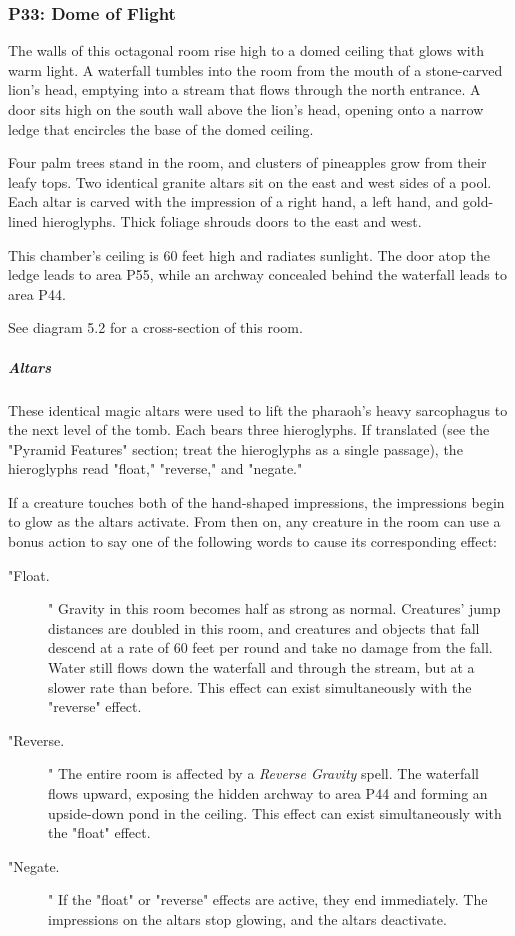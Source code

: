 \documentclass[10pt,a4paper,twoside,bg=print,twocolumn,openany,nodeprecatedcode]{dndbook}
\begin{document}
\subsubsection{P33: Dome of Flight}
\begin{DndReadAloud}{}
The walls of this octagonal room rise high to a domed ceiling that glows with warm light. A waterfall tumbles into the room from the mouth of a stone-carved lion's head, emptying into a stream that flows through the north entrance. A door sits high on the south wall above the lion's head, opening onto a narrow ledge that encircles the base of the domed ceiling.

Four palm trees stand in the room, and clusters of pineapples grow from their leafy tops. Two identical granite altars sit on the east and west sides of a pool. Each altar is carved with the impression of a right hand, a left hand, and gold-lined hieroglyphs. Thick foliage shrouds doors to the east and west.

\end{DndReadAloud}

This chamber's ceiling is 60 feet high and radiates sunlight. The door atop the ledge leads to area P55, while an archway concealed behind the waterfall leads to area P44.

See diagram 5.2 for a cross-section of this room.

\subparagraph{Altars}
These identical magic altars were used to lift the pharaoh's heavy sarcophagus to the next level of the tomb. Each bears three hieroglyphs. If translated (see the "Pyramid Features" section; treat the hieroglyphs as a single passage), the hieroglyphs read "float," "reverse," and "negate."

If a creature touches both of the hand-shaped impressions, the impressions begin to glow as the altars activate. From then on, any creature in the room can use a bonus action to say one of the following words to cause its corresponding effect:


\begin{description}
\item["Float.]
" Gravity in this room becomes half as strong as normal. Creatures' jump distances are doubled in this room, and creatures and objects that fall descend at a rate of 60 feet per round and take no damage from the fall. Water still flows down the waterfall and through the stream, but at a slower rate than before. This effect can exist simultaneously with the "reverse" effect.
\item["Reverse.]
" The entire room is affected by a \textit{Reverse Gravity} spell. The waterfall flows upward, exposing the hidden archway to area P44 and forming an upside-down pond in the ceiling. This effect can exist simultaneously with the "float" effect.
\item["Negate.]
" If the "float" or "reverse" effects are active, they end immediately. The impressions on the altars stop glowing, and the altars deactivate.
\end{description}
\end{document}
